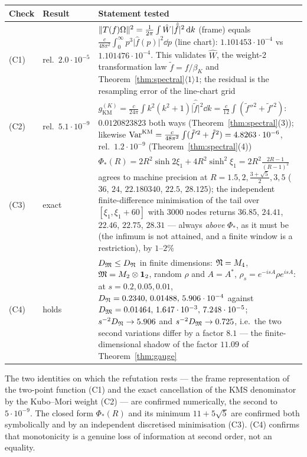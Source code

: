 \documentclass[11pt]{article}
\newcommand{\abs}[1]{\lvert#1\rvert}
\newcommand{\gKM}{g_{\mathrm{KM}}}\newcommand{\gB}{g_{\mathrm B}}
\begin{document}
\begin{center}\small
\begin{tabular}{@{}llp{}@{}}\toprule
\textbf{Check} & \textbf{Result} & \textbf{Statement tested}\\\midrule
(C1) & rel.\ $2.0\cdot10^{-5}$ &
 $\norm{T(f)\Om}^2=\frac1{2\pi}\int\hat W\abs{\hat{\tilde f}}^2\dd k$ (frame) equals
 $\frac c{48\pi^2}\int_0^\infty p^3\abs{\hat f(p)}^2\dd p$ (line chart):
 $1.101453\cdot10^{-4}$ vs $1.101476\cdot10^{-4}$.  This validates $\hat W$, the weight-2 transformation
 law $\tilde f=f/\beta_K$ and Theorem~\ref{thm:spectral}$\langle1\rangle1$; the residual is the
 resampling error of the line-chart grid\\
(C2) & rel.\ $5.1\cdot10^{-9}$ &
 $\gKM^{(K)}=\frac c{24\pi}\int k^2(k^2+1)\abs{\hat{\tilde f}}^2\dd k
 =\frac c{12}\int(\tilde f''^2+\tilde f'^2)$: $0.0120823823$ both ways
 (Theorem~\ref{thm:spectral}(3)); likewise
 $\operatorname{Var}^{\mathrm{KM}}=\frac c{48\pi^2}\int(\tilde f'^2+\tilde f^2)=4.8263\cdot10^{-6}$, rel.\
 $1.2\cdot10^{-9}$ (Theorem~\ref{thm:spectral}(4))\\
(C3) & exact & $\Phi_*(R)=2R^2\sinh2\xi_1+4R^2\sinh^2\xi_1=2R^2\frac{2R-1}{(R-1)^2}$ agrees to machine
 precision at $R=1.5,2,\frac{3+\sqrt5}2,3,5$ ($36$, $24$, $22.180340$, $22.5$, $28.125$);
 the independent finite-difference minimisation of the tail over $[\xi_1,\xi_1+60]$ with $3000$ nodes
 returns $36.85$, $24.41$, $22.46$, $22.75$, $28.31$ --- always \emph{above} $\Phi_*$, as it must be
 (the infimum is not attained, and a finite window is a restriction), by $1$--$2\%$\\
(C4) & holds & $D_{\mathfrak M}\le D_{\mathfrak N}$ in finite dimensions: $\mathfrak N=M_4$, $\mathfrak M=M_2\otimes\mathbf 1_2$, random
 $\rho$ and $A=A^*$, $\rho_s=e^{-isA}\rho e^{isA}$: at $s=0.2,0.05,0.01$,
 $D_{\mathfrak N}=0.2340,\,0.01488,\,5.906\cdot10^{-4}$ against
 $D_{\mathfrak M}=0.01464,\,1.647\cdot10^{-3},\,7.248\cdot10^{-5}$; $s^{-2}D_{\mathfrak N}\to5.906$ and
 $s^{-2}D_{\mathfrak M}\to0.725$, i.e.\ the two second variations differ by a factor $8.1$ --- the
 finite-dimensional shadow of the factor $11.09$ of Theorem~\ref{thm:gauge}\\\bottomrule
\end{tabular}
\end{center}

\begin{verdictok}
The two identities on which the refutation rests --- the frame representation of the two-point function
(C1) and the exact cancellation of the KMS denominator by the Kubo--Mori weight (C2) --- are confirmed
numerically, the second to $5\cdot10^{-9}$.  The closed form $\Phi_*(R)$ and its minimum $11+5\sqrt5$ are
confirmed both symbolically and by an independent discretised minimisation (C3).  (C4) confirms that
monotonicity is a genuine loss of information at second order, not an equality.
\end{verdictok}
\end{document}
